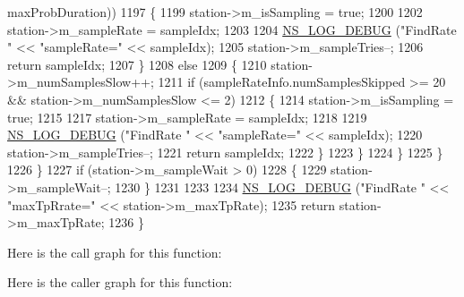 \begin{DoxyCode}
      maxProbDuration))
1197                 \{
1199                   station->m\_isSampling = \textcolor{keyword}{true};
1200 
1202                   station->m\_sampleRate = sampleIdx;
1203 
1204                   \hyperlink{group__logging_ga413f1886406d49f59a6a0a89b77b4d0a}{NS\_LOG\_DEBUG} (\textcolor{stringliteral}{"FindRate "} << \textcolor{stringliteral}{"sampleRate="} << sampleIdx);
1205                   station->m\_sampleTries--;
1206                   \textcolor{keywordflow}{return} sampleIdx;
1207                 \}
1208               \textcolor{keywordflow}{else}
1209                 \{
1210                   station->m\_numSamplesSlow++;
1211                   \textcolor{keywordflow}{if} (sampleRateInfo.numSamplesSkipped >= 20 && station->m\_numSamplesSlow <= 2)
1212                     \{
1214                       station->m\_isSampling = \textcolor{keyword}{true};
1215 
1217                       station->m\_sampleRate = sampleIdx;
1218 
1219                       \hyperlink{group__logging_ga413f1886406d49f59a6a0a89b77b4d0a}{NS\_LOG\_DEBUG} (\textcolor{stringliteral}{"FindRate "} << \textcolor{stringliteral}{"sampleRate="} << sampleIdx);
1220                       station->m\_sampleTries--;
1221                       \textcolor{keywordflow}{return} sampleIdx;
1222                     \}
1223                 \}
1224             \}
1225         \}
1226     \}
1227   \textcolor{keywordflow}{if} (station->m\_sampleWait > 0)
1228     \{
1229       station->m\_sampleWait--;
1230     \}
1231 
1233 
1234   \hyperlink{group__logging_ga413f1886406d49f59a6a0a89b77b4d0a}{NS\_LOG\_DEBUG} (\textcolor{stringliteral}{"FindRate "} << \textcolor{stringliteral}{"maxTpRrate="} << station->m\_maxTpRate);
1235   \textcolor{keywordflow}{return} station->m\_maxTpRate;
1236 \}
\end{DoxyCode}


Here is the call graph for this function\+:




Here is the caller graph for this function\+:


